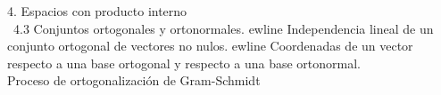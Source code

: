 \documentclass[preview]{standalone}
\begin{document}
\begin{center}
4. Espacios con producto interno \\\ 4.3 Conjuntos ortogonales y ortonormales. 
ewline  Independencia lineal de un conjunto ortogonal de vectores no nulos. 
ewline Coordenadas de un vector respecto a una base ortogonal y respecto a una base ortonormal. \\ Proceso de ortogonalización de Gram-Schmidt
\end{center}
\end{document}
